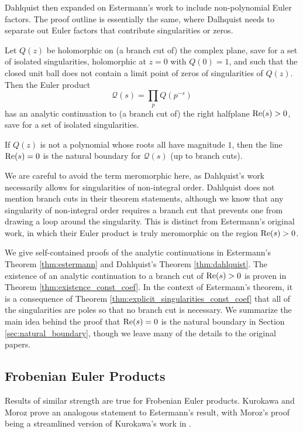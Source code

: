 \documentclass[12pt]{amsart}
\theoremstyle{plain}
\begin{document}
Dahlquist \cite{dahlquist_1952} then expanded on Estermann's work to include non-polynomial Euler factors. The proof outline is essentially the same, where Dalhquist needs to separate out Euler factors that contribute singularities or zeros.

\begin{theorem}\label{thm:dahlquist}
    Let $Q(z)$ be holomorphic on (a branch cut of) the complex plane, save for a set of isolated singularities, holomorphic at $z=0$ with $Q(0)=1$, and such that the closed unit ball does not contain a limit point of zeros of singularities of $Q(z)$. Then the Euler product
    \[
    \mathcal{Q}(s) = \prod_p Q(p^{-s})
    \]
    has an analytic continuation to (a branch cut of) the right halfplane ${\rm Re}(s) > 0$, save for a set of isolated singularities.

    If $Q(z)$ is not a polynomial whose roots all have magnitude $1$, then the line ${\rm Re}(s)=0$ is the natural boundary for $\mathcal{Q}(s)$ (up to branch cuts).
\end{theorem}

We are careful to avoid the term meromorphic here, as Dahlquist's work necessarily allows for singularities of non-integral order. Dahlquist does not mention branch cuts in their theorem statements, although we know that any singularity of non-integral order requires a branch cut that prevents one from drawing a loop around the singularity. This is distinct from Estermann's original work, in which their Euler product is truly meromorphic on the region ${\rm Re}(s) > 0$.

We give self-contained proofs of the analytic continuations in Estermann's Theorem \ref{thm:estermann} and Dahlquist's Theorem \ref{thm:dahlquist}. The existence of an analytic continuation to a branch cut of ${\rm Re}(s) > 0$ is proven in Theorem \ref{thm:existence_const_coef}. In the context of Estermann's theorem, it is a consequence of Theorem \ref{thm:explicit_singularities_const_coef} that all of the singularities are poles so that no branch cut is necessary. We summarize the main idea behind the proof that ${\rm Re}(s)=0$ is the natural boundary in Section \ref{sec:natural_boundary}, though we leave many of the details to the original papers.



\subsection{Frobenian Euler Products}\label{subsec:history_Frob_coef}
Results of similar strength are true for Frobenian Euler products. Kurokawa \cite{kurokawa_1978,kurokawa_1986I,kurokawa_1986II} and Moroz \cite{moroz_1988} prove an analogous statement to Estermann's result, with Moroz's proof being a streamlined version of Kurokawa's work in \cite{kurokawa_1978}.
\end{document}
